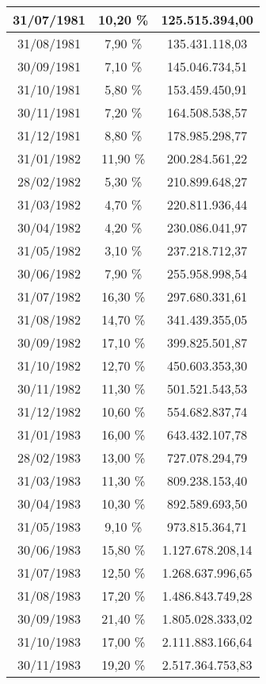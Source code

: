 \begin{center}
\begin{longtable}{|c|c|c|}
31/07/1981 & 10,20 \% & 125.515.394,00  \\ \hline
31/08/1981 & 7,90 \% & 135.431.118,03  \\ \hline
30/09/1981 & 7,10 \% & 145.046.734,51  \\ \hline
31/10/1981 & 5,80 \% & 153.459.450,91  \\ \hline
30/11/1981 & 7,20 \% & 164.508.538,57  \\ \hline
31/12/1981 & 8,80 \% & 178.985.298,77  \\ \hline
31/01/1982 & 11,90 \% & 200.284.561,22  \\ \hline
28/02/1982 & 5,30 \% & 210.899.648,27  \\ \hline
31/03/1982 & 4,70 \% & 220.811.936,44  \\ \hline
30/04/1982 & 4,20 \% & 230.086.041,97  \\ \hline
31/05/1982 & 3,10 \% & 237.218.712,37  \\ \hline
30/06/1982 & 7,90 \% & 255.958.998,54  \\ \hline
31/07/1982 & 16,30 \% & 297.680.331,61  \\ \hline
31/08/1982 & 14,70 \% & 341.439.355,05  \\ \hline
30/09/1982 & 17,10 \% & 399.825.501,87  \\ \hline
31/10/1982 & 12,70 \% & 450.603.353,30  \\ \hline
30/11/1982 & 11,30 \% & 501.521.543,53  \\ \hline
31/12/1982 & 10,60 \% & 554.682.837,74  \\ \hline
31/01/1983 & 16,00 \% & 643.432.107,78  \\ \hline
28/02/1983 & 13,00 \% & 727.078.294,79  \\ \hline
31/03/1983 & 11,30 \% & 809.238.153,40  \\ \hline
30/04/1983 & 10,30 \% & 892.589.693,50  \\ \hline
31/05/1983 & 9,10 \% & 973.815.364,71  \\ \hline
30/06/1983 & 15,80 \% & 1.127.678.208,14  \\ \hline
31/07/1983 & 12,50 \% & 1.268.637.996,65  \\ \hline
31/08/1983 & 17,20 \% & 1.486.843.749,28  \\ \hline
30/09/1983 & 21,40 \% & 1.805.028.333,02  \\ \hline
31/10/1983 & 17,00 \% & 2.111.883.166,64  \\ \hline
30/11/1983 & 19,20 \% & 2.517.364.753,83  \\ \hline

\end{longtable}
\end{center}
